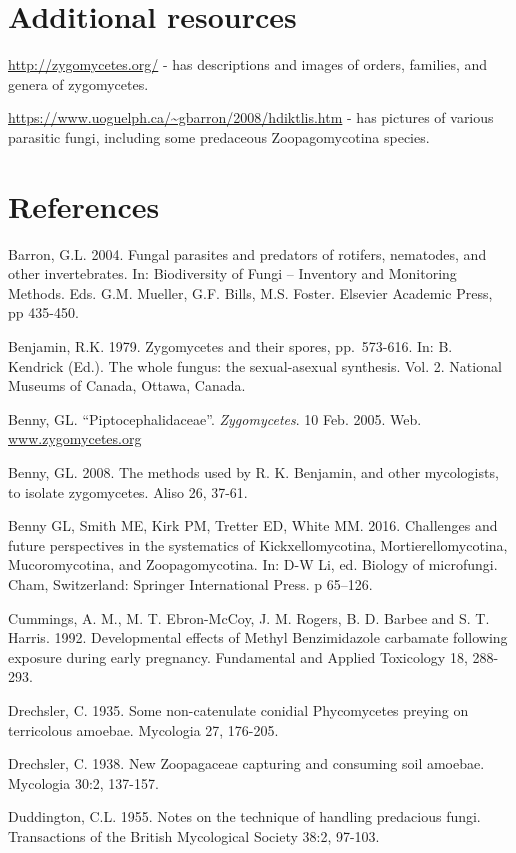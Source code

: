 \documentclass[]{book}
\begin{document}
\section{Additional resources}\label{additional-resources}

\url{http://zygomycetes.org/} - has descriptions and images of orders,
families, and genera of zygomycetes.

\url{https://www.uoguelph.ca/~gbarron/2008/hdiktlis.htm} - has pictures
of various parasitic fungi, including some predaceous Zoopagomycotina
species.

\section{References}\label{references-1}

Barron, G.L. 2004. Fungal parasites and predators of rotifers,
nematodes, and other invertebrates. In: Biodiversity of Fungi --
Inventory and Monitoring Methods. Eds. G.M. Mueller, G.F. Bills, M.S.
Foster. Elsevier Academic Press, pp 435-450.

Benjamin, R.K. 1979. Zygomycetes and their spores, pp.~573-616. In: B.
Kendrick (Ed.). The whole fungus: the sexual-asexual synthesis. Vol. 2.
National Museums of Canada, Ottawa, Canada.

Benny, GL. ``Piptocephalidaceae''. \emph{Zygomycetes}. 10 Feb. 2005.
Web. \href{http://www.zygomycetes.org}{www.zygomycetes.org}

Benny, GL. 2008. The methods used by R. K. Benjamin, and other
mycologists, to isolate zygomycetes. Aliso 26, 37-61.

Benny GL, Smith ME, Kirk PM, Tretter ED, White MM. 2016. Challenges and
future perspectives in the systematics of Kickxellomycotina,
Mortierellomycotina, Mucoromycotina, and Zoopagomycotina. In: D-W Li,
ed. Biology of microfungi. Cham, Switzerland: Springer International
Press. p 65--126.

Cummings, A. M., M. T. Ebron-McCoy, J. M. Rogers, B. D. Barbee and S. T.
Harris. 1992. Developmental effects of Methyl Benzimidazole carbamate
following exposure during early pregnancy. Fundamental and Applied
Toxicology 18, 288-293.

Drechsler, C. 1935. Some non-catenulate conidial Phycomycetes preying on
terricolous amoebae. Mycologia 27, 176-205.

Drechsler, C. 1938. New Zoopagaceae capturing and consuming soil
amoebae. Mycologia 30:2, 137-157.

Duddington, C.L. 1955. Notes on the technique of handling predacious
fungi. Transactions of the British Mycological Society 38:2, 97-103.
\end{document}
